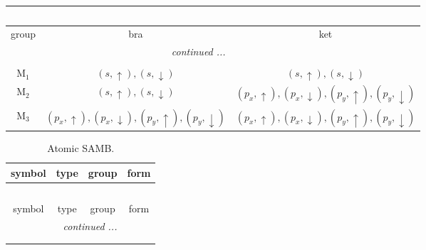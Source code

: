 \documentclass[fleqn,10pt,landscape]{article}
\begin{document}
\begin{itemize}
\begin{center}
\begin{longtable}{c|c|c}
\multicolumn{2}{l}{\tablename\ \thetable{}} \\
 \hline \hline
group & bra & ket \\ \hline \endhead

 \hline \hline
\multicolumn{2}{r}{\footnotesize\it continued ...} \\ \endfoot

 \hline \hline
\multicolumn{2}{r}{} \\ \endlastfoot

M$_{1}$ & $(s,\uparrow), (s,\downarrow)$ & $(s,\uparrow), (s,\downarrow)$ \\
M$_{2}$ & $(s,\uparrow), (s,\downarrow)$ & $(p_{x},\uparrow), (p_{x},\downarrow), (p_{y},\uparrow), (p_{y},\downarrow)$ \\
M$_{3}$ & $(p_{x},\uparrow), (p_{x},\downarrow), (p_{y},\uparrow), (p_{y},\downarrow)$ & $(p_{x},\uparrow), (p_{x},\downarrow), (p_{y},\uparrow), (p_{y},\downarrow)$ \\
\end{longtable}
\end{center}
\begin{center}
\renewcommand{\arraystretch}{1.3}
\begin{longtable}{c|c|c|c}
\caption{Atomic SAMB.}
 \\
 \hline \hline
symbol & type & group & form \\ \hline \endfirsthead

\multicolumn{3}{l}{\tablename\ \thetable{}} \\
 \hline \hline
symbol & type & group & form \\ \hline \endhead

 \hline \hline
\multicolumn{3}{r}{\footnotesize\it continued ...} \\ \endfoot

 \hline \hline
\multicolumn{3}{r}{} \\ \endlastfoot


\end{longtable}
\end{center}
\end{itemize}
\end{document}
